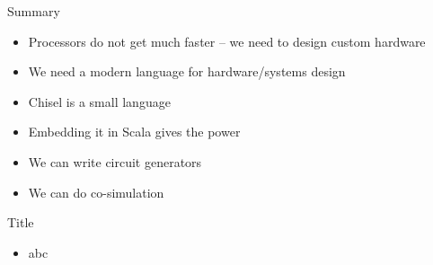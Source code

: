 \begin{frame}[fragile]{Summary}
\begin{itemize}
\item Processors do not get much faster -- we need to design custom hardware
\item We need a modern language for hardware/systems design
\item Chisel is a small language
\item Embedding it in Scala gives the power
\item We can write circuit generators
\item We can do co-simulation
\end{itemize}
\end{frame}



\begin{frame}[fragile]{Title}
\begin{itemize}
\item abc
\end{itemize}
\end{frame}
